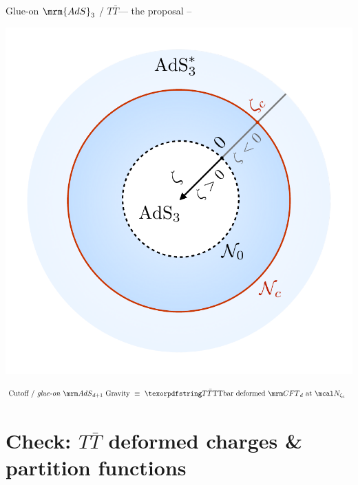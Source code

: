 \documentclass[
	10pt
	,noamsthm
]{beamer}
\newcommand{\TTbar}{\texorpdfstring{\ensuremath{T\bar{T}}}{TTbar}\xspace}
\begin{document}
\begin{frame}{Glue-on $\mrm{AdS}_3$ / \TTbar --- the proposal}{%
	\textcite{Apolo:2023vnm} -- 
}
\centering
\vspace{-.5\baselineskip}
\begin{minipage}{.5\textwidth}
\centering
\includegraphics[width=.9\linewidth]{img/diagram.pdf}
\end{minipage}
\vspace{-.1\baselineskip}
\begin{equation*}
\stateGlueon
\end{equation*}
\end{frame}

\section{\textbf{Check:} \TTbar deformed charges \& partition functions} \label{se:charges}
\end{document}
